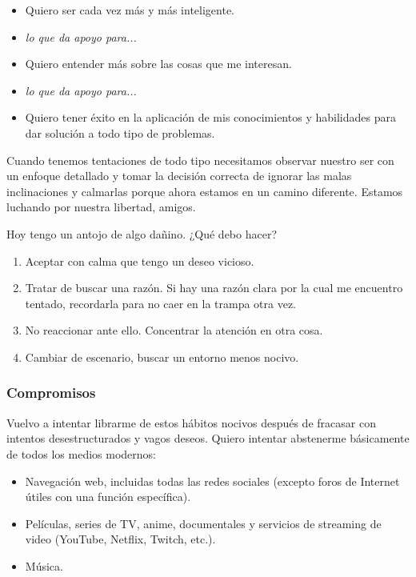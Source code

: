 \documentclass[12pt]{article}
\begin{document}
	\begin{itemize}
	\item Quiero ser cada vez más y más inteligente.
	\item[] \textit{lo que da apoyo para...}
	\item Quiero entender más sobre las cosas que me interesan.
	\item[] \textit{lo que da apoyo para...}
	\item Quiero tener éxito en la aplicación de mis conocimientos y
		habilidades para dar solución a todo tipo de problemas.
	\end{itemize}

	Cuando tenemos tentaciones de todo tipo necesitamos observar nuestro
	ser con un enfoque detallado y tomar la decisión correcta de ignorar las
	malas inclinaciones y calmarlas porque ahora estamos en un camino
	diferente. Estamos luchando por nuestra libertad, amigos.

	Hoy tengo un antojo de algo dañino. ¿Qué debo hacer?

	\begin{enumerate}
	\item Aceptar con calma que tengo un deseo vicioso.
	\item Tratar de buscar una razón. Si hay una razón clara por la cual me
		encuentro tentado, recordarla
	para no caer en la trampa otra vez.
	\item No reaccionar ante ello. Concentrar la atención en otra cosa.
	\item Cambiar de escenario, buscar un entorno menos nocivo.
	\end{enumerate}

	\subsubsection*{Compromisos}

	Vuelvo a intentar librarme de estos hábitos nocivos después de fracasar
	con intentos desestructurados y vagos deseos. Quiero intentar
	abstenerme básicamente de todos los medios modernos:

	\begin{itemize}
	\item Navegación web, incluidas todas las redes sociales (excepto foros
	de Internet útiles con una función específica).
	\item Películas, series de TV, anime, documentales y servicios de
	streaming de video (YouTube, Netflix, Twitch, etc.).
	\item Música.
	\end{itemize}
\end{document}

